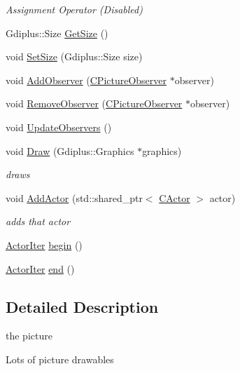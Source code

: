 \begin{DoxyCompactItemize}
\begin{DoxyCompactList}\small\item\em Assignment Operator (Disabled) \end{DoxyCompactList}\item 
Gdiplus\+::\+Size \hyperlink{class_c_picture_af2677c395a3cb8d6e7d0860839801e5b}{Get\+Size} ()
\item 
void \hyperlink{class_c_picture_a66b8de27d3435e19024307254e918e3a}{Set\+Size} (Gdiplus\+::\+Size size)
\item 
void \hyperlink{class_c_picture_a6be8632e9b1c468dcf27e8452baf5605}{Add\+Observer} (\hyperlink{class_c_picture_observer}{C\+Picture\+Observer} $\ast$observer)
\item 
void \hyperlink{class_c_picture_a548ad72979b2a11c2669d9896f32bf92}{Remove\+Observer} (\hyperlink{class_c_picture_observer}{C\+Picture\+Observer} $\ast$observer)
\item 
void \hyperlink{class_c_picture_a971ca9c9100725b7d1a900adcfe889d6}{Update\+Observers} ()
\item 
void \hyperlink{class_c_picture_aca6a4829388fdfe3ecdc42f0e788b712}{Draw} (Gdiplus\+::\+Graphics $\ast$graphics)
\begin{DoxyCompactList}\small\item\em draws \end{DoxyCompactList}\item 
void \hyperlink{class_c_picture_a90799f3ea10ffea8fbb0ea2b9d24a525}{Add\+Actor} (std\+::shared\+\_\+ptr$<$ \hyperlink{class_c_actor}{C\+Actor} $>$ actor)
\begin{DoxyCompactList}\small\item\em adds that actor \end{DoxyCompactList}\item 
\hyperlink{class_c_picture_1_1_actor_iter}{Actor\+Iter} \hyperlink{class_c_picture_a8461cc11cc1ce334b4cf92e2ee4a4ebe}{begin} ()
\item 
\hyperlink{class_c_picture_1_1_actor_iter}{Actor\+Iter} \hyperlink{class_c_picture_a63840c7eff74388a204c750908a23933}{end} ()
\end{DoxyCompactItemize}


\subsection{Detailed Description}
the picture

Lots of picture drawables 

